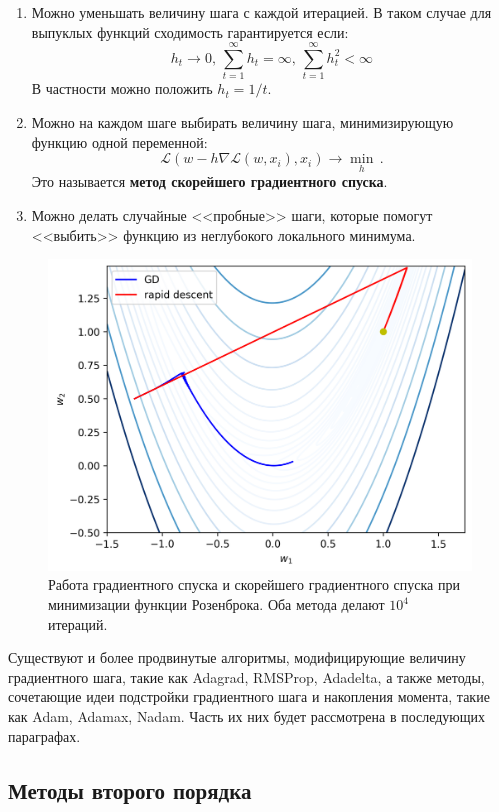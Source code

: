 \begin{enumerate}
    \item Можно уменьшать величину шага с каждой итерацией. В таком случае для выпуклых функций сходимость гарантируется если:
    \[
    h_t \rightarrow 0,\, \sum_{t = 1}^{\infty} h_t = \infty,\, \sum_{t=1}^{\infty} h_t^2 < \infty
    \]
    В частности можно положить $h_t = 1 / t$.
    \item Можно на каждом шаге выбирать величину шага, минимизирующую функцию одной переменной:
    \[
    \mathcal{L}(w - h \nabla \mathcal{L}(w, x_i), x_i) \rightarrow \min_h\,.
    \]
    Это называется \textbf{метод скорейшего градиентного спуска}.
    \item Можно делать случайные <<пробные>> шаги, которые помогут <<выбить>> функцию из неглубокого локального минимума.
\end{enumerate}

\begin{figure}[h]
	\centering
	\includegraphics[width=0.6\linewidth]{chapters/neural/images/gd_rd_example.png}
	\caption{Работа градиентного спуска и скорейшего градиентного спуска при минимизации функции Розенброка. Оба метода делают $10^4$ итераций.}
	\label{img:gd_osc}
\end{figure}

\begin{remark}
Существуют и более продвинутые алгоритмы, модифицирующие величину градиентного шага, такие как Adagrad, RMSProp, Adadelta, а также методы, сочетающие идеи подстройки градиентного шага и накопления момента, такие как Adam, Adamax, Nadam. Часть их них будет рассмотрена в последующих параграфах.
\end{remark}

\subsection{Методы второго порядка}

